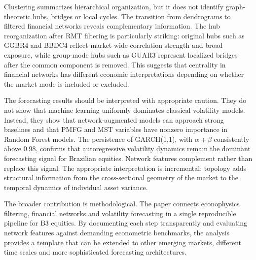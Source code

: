 Clustering summarizes hierarchical organization, but it does not identify graph-theoretic hubs, bridges or local cycles. The transition from dendrograms to filtered financial networks reveals complementary information. The hub reorganization after RMT filtering is particularly striking: original hubs such as GGBR4 and BBDC4 reflect market-wide correlation strength and broad exposure, while group-mode hubs such as GUAR3 represent localized bridges after the common component is removed. This suggests that centrality in financial networks has different economic interpretations depending on whether the market mode is included or excluded.

The forecasting results should be interpreted with appropriate caution. They do not show that machine learning uniformly dominates classical volatility models. Instead, they show that network-augmented models can approach strong baselines and that PMFG and MST variables have nonzero importance in Random Forest models. The persistence of GARCH(1,1), with $\alpha + \beta$ consistently above 0.98, confirms that autoregressive volatility dynamics remain the dominant forecasting signal for Brazilian equities. Network features complement rather than replace this signal. The appropriate interpretation is incremental: topology adds structural information from the cross-sectional geometry of the market to the temporal dynamics of individual asset variance.

The broader contribution is methodological. The paper connects econophysics filtering, financial networks and volatility forecasting in a single reproducible pipeline for B3 equities. By documenting each step transparently and evaluating network features against demanding econometric benchmarks, the analysis provides a template that can be extended to other emerging markets, different time scales and more sophisticated forecasting architectures.
